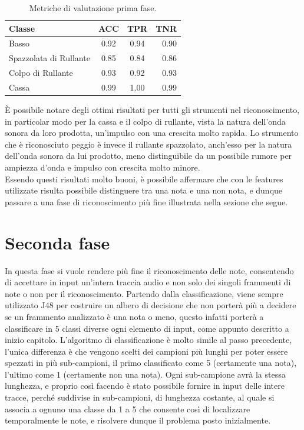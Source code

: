 \begin{table}[h!]
	\begin{center}
		\begin{tabular}{l|c|c|r} %
			\textbf{Classe} & \textbf{ACC} & \textbf{TPR} & \textbf{TNR} \\
			\hline
			Basso & 0.92 & 0.94 & 0.90\\
			Spazzolata di Rullante & 0.85 & 0.84 & 0.86\\
			Colpo di Rullante & 0.93 & 0.92 & 0.93\\
			Cassa & 0.99 & 1.00 & 0.99
		\end{tabular}
		\caption{Metriche di valutazione prima fase.}
		\label{tab:accuracy_1}
	\end{center}
\end{table}

È possibile notare degli ottimi risultati per tutti gli strumenti nel riconoscimento, in particolar modo per la cassa e il colpo di rullante, vista la natura dell'onda sonora da loro prodotta, un'impulso con una crescita molto rapida. Lo strumento che è riconosciuto peggio è invece il rullante spazzolato, anch'esso per la natura dell'onda sonora da lui prodotto, meno distinguibile da un possibile rumore per ampiezza d'onda e impulso con crescita molto minore.\\
Essendo questi risultati molto buoni, è possibile affermare che con le features utilizzate risulta possibile distinguere tra una nota e una non nota, e dunque passare a una fase di riconoscimento più fine illustrata nella sezione che segue.\\

\section{Seconda fase}
In questa fase si vuole rendere più fine il riconoscimento delle note, consentendo di accettare in input un'intera traccia audio e non solo dei singoli frammenti di note o non per il riconoscimento. Partendo dalla classificazione, viene sempre utilizzato J48 per costruire un albero di decisione che non porterà più a decidere se un frammento analizzato è una nota o meno, questo infatti porterà a classificare in 5 classi diverse ogni elemento di input, come appunto descritto a inizio capitolo. L'algoritmo di classificazione è molto simile al passo precedente, l'unica differenza è che vengono scelti dei campioni più lunghi per poter essere spezzati in più sub-campioni, il primo classificato come 5 (certamente una nota), l'ultimo come 1 (certamente non una nota). Ogni sub-campione avrà la stessa lunghezza, e proprio così facendo è stato possibile fornire in input delle intere tracce, perché suddivise in sub-campioni, di lunghezza costante, al quale si associa a ognuno una classe da 1 a 5 che consente così di localizzare temporalmente le note, e risolvere dunque il problema posto inizialmente.\\

